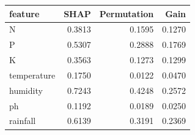 \begin{tabular}{lrrr}
\toprule
feature & SHAP & Permutation & Gain \\
\midrule
N & 0.3813 & 0.1595 & 0.1270 \\
P & 0.5307 & 0.2888 & 0.1769 \\
K & 0.3563 & 0.1273 & 0.1299 \\
temperature & 0.1750 & 0.0122 & 0.0470 \\
humidity & 0.7243 & 0.4248 & 0.2572 \\
ph & 0.1192 & 0.0189 & 0.0250 \\
rainfall & 0.6139 & 0.3191 & 0.2369 \\
\bottomrule
\end{tabular}
